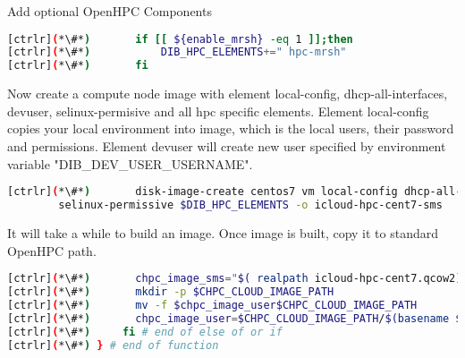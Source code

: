 Add optional OpenHPC Components


\begin{lstlisting}[language=bash,keywords={}]
[ctrlr](*\#*)       if [[ ${enable_mrsh} -eq 1 ]];then
[ctrlr](*\#*)           DIB_HPC_ELEMENTS+=" hpc-mrsh"
[ctrlr](*\#*)       fi
\end{lstlisting} 

Now create a compute node image with element local-config, dhcp-all-interfaces, devuser, selinux-permisive and all hpc specific elements. Element local-config copies your local environment into image, which is the local users, their password and permissions. Element devuser will create new user specified by environment variable "DIB\_DEV\_USER\_USERNAME". 


\begin{lstlisting}[language=bash,keywords={}]
[ctrlr](*\#*)       disk-image-create centos7 vm local-config dhcp-all-interfaces devuser \
        selinux-permissive $DIB_HPC_ELEMENTS -o icloud-hpc-cent7-sms
\end{lstlisting} 


It will take a while to build an image. Once image is built, copy it to standard OpenHPC path.


\begin{lstlisting}[language=bash,keywords={}]
[ctrlr](*\#*)       chpc_image_sms="$( realpath icloud-hpc-cent7.qcow2)"
[ctrlr](*\#*)       mkdir -p $CHPC_CLOUD_IMAGE_PATH
[ctrlr](*\#*)       mv -f $chpc_image_user$CHPC_CLOUD_IMAGE_PATH
[ctrlr](*\#*)       chpc_image_user=$CHPC_CLOUD_IMAGE_PATH/$(basename $chpc_image_sms)
[ctrlr](*\#*)     fi # end of else of or if
[ctrlr](*\#*) } # end of function
\end{lstlisting} 

